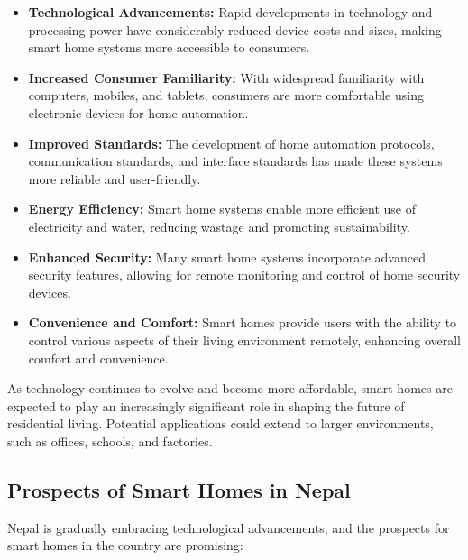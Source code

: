 \begin{itemize}
	\item \textbf{Technological Advancements:} Rapid developments in technology and processing power have considerably reduced device costs and sizes, making smart home systems more accessible to consumers.
	\item \textbf{Increased Consumer Familiarity:} With widespread familiarity with computers, mobiles, and tablets, consumers are more comfortable using electronic devices for home automation.
	\item \textbf{Improved Standards:} The development of home automation protocols, communication standards, and interface standards has made these systems more reliable and user-friendly.
	\item \textbf{Energy Efficiency:} Smart home systems enable more efficient use of electricity and water, reducing wastage and promoting sustainability.
	\item \textbf{Enhanced Security:} Many smart home systems incorporate advanced security features, allowing for remote monitoring and control of home security devices.
	\item \textbf{Convenience and Comfort:} Smart homes provide users with the ability to control various aspects of their living environment remotely, enhancing overall comfort and convenience.
\end{itemize}

As technology continues to evolve and become more affordable, smart homes are expected to play an increasingly significant role in shaping the future of residential living. Potential applications could extend to larger environments, such as offices, schools, and factories.

\subsection*{Prospects of Smart Homes in Nepal}

Nepal is gradually embracing technological advancements, and the prospects for smart homes in the country are promising:

